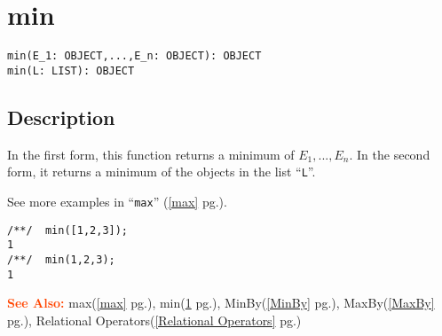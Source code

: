 \documentclass[a4paper]{mybook}
\newenvironment{command}{}{} %
\newcommand\SeeAlso{\par\textcolor{OrangeRed}{\textbf{\large See Also: }}}
\begin{document}
\section{min}
\label{min}
\begin{command} %


\begin{Verbatim}[label=syntax, rulecolor=\color{MidnightBlue},
frame=single]
min(E_1: OBJECT,...,E_n: OBJECT): OBJECT
min(L: LIST): OBJECT
\end{Verbatim}


\subsection*{Description}

In the first form, this function returns a minimum of $E_1,...,E_n$.
In the second form, it returns a minimum of the objects in the list ``\verb&L&''.
\par 
See more examples in ``\verb&max&'' (\ref{max} pg.\pageref{max}).
\begin{Verbatim}[label=example, rulecolor=\color{PineGreen}, frame=single]
/**/  min([1,2,3]);
1
/**/  min(1,2,3);
1
\end{Verbatim}


\SeeAlso %
  max(\ref{max} pg.\pageref{max}), 
    min(\ref{min} pg.\pageref{min}), 
    MinBy(\ref{MinBy} pg.\pageref{MinBy}), 
    MaxBy(\ref{MaxBy} pg.\pageref{MaxBy}), 
    Relational Operators(\ref{Relational Operators} pg.\pageref{Relational Operators})
\end{command} %
\end{document}
